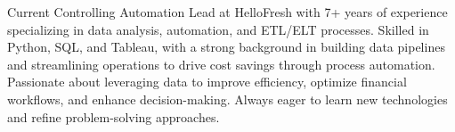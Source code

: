 

\begin{cvparagraph}

Current Controlling Automation Lead at HelloFresh with 7+ years of experience specializing in data analysis, automation, and ETL/ELT processes. Skilled in Python, SQL, and Tableau, with a strong background in building data pipelines and streamlining operations to drive cost savings through process automation. Passionate about leveraging data to improve efficiency, optimize financial workflows, and enhance decision-making. Always eager to learn new technologies and refine problem-solving approaches.
\end{cvparagraph}
